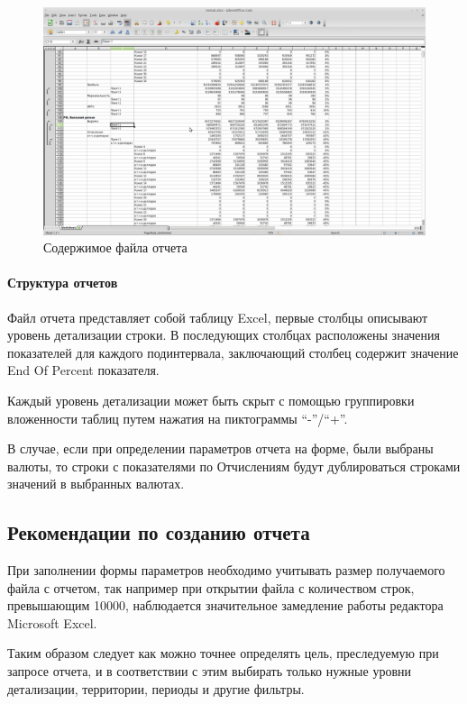 \begin{figure}[!ht]
\begin{center}
\hspace*{-1cm} \includegraphics[scale=0.35, trim=0mm 100mm 150mm 50mm, clip]{../resources/report1.png}
\caption{Содержимое файла отчета}
\end{center}
\end{figure}

\paragraph{Структура отчетов}
Файл отчета представляет собой таблицу Excel, первые
столбцы описывают уровень детализации строки. В последующих столбцах
расположены значения показателей для каждого подинтервала, заключающий столбец
содержит значение End Of Percent показателя.

Каждый уровень детализации может быть скрыт с помощью группировки вложенности
таблиц путем нажатия на пиктограммы ``-''/``+''.

В случае, если при определении параметров отчета на форме, были выбраны валюты,
то строки с показателями по Отчислениям будут дублироваться строками значений
в выбранных валютах.

\subsection*{Рекомендации по созданию отчета}
При заполнении формы параметров необходимо учитывать размер получаемого файла с отчетом,
так например при открытии файла с количеством строк, превышающим 10000, наблюдается
значительное замедление работы редактора Microsoft Excel.

Таким образом следует как можно точнее определять цель, преследуемую при запросе
отчета, и в соответствии с этим выбирать только нужные уровни детализации, территории,
периоды и другие фильтры.

